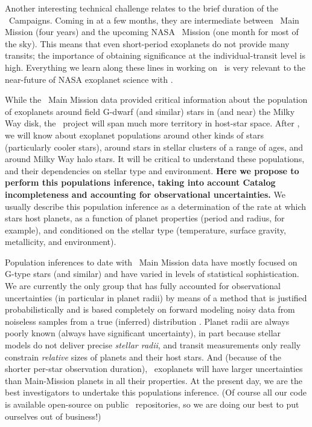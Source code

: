 \documentclass[12pt,preprint]{aastex}
\newcommand{\github}{\project{GitHub}}
\begin{document}
Another interesting technical challenge relates to the brief duration
of the \kt\ Campaigns.
Coming in at a few months, they are intermediate between \kepler\ Main
Mission (four years) and the upcoming NASA \tess\ Mission (one month for most of the sky).
This means that even short-period exoplanets do not provide many
transits; the importance of obtaining significance at the
individual-transit level is high.
Everything we learn along these lines in working on \kt\ is very
relevant to the near-future of NASA exoplanet science with \tess.

While the \kepler\ Main Mission data provided critical information
about the population of exoplanets around field G-dwarf (and similar) stars
in (and near) the Milky Way disk, the \kt\ project will span much more
territory in host-star space.
After \kt, we will know about exoplanet populations around other kinds
of stars (particularly cooler stars), around stars in stellar clusters
of a range of ages, and around Milky Way halo stars.
It will be critical to understand these populations, and their
dependencies on stellar type and environment.
\textbf{Here we propose to perform this populations inference, taking
  into account Catalog incompleteness and accounting for observational
  uncertainties.}
We usually describe this population inference as a determination of the
rate at which stars host planets, as a function of planet properties
(period and radius, for example), and conditioned on the stellar type
(temperature, surface gravity, metallicity, and environment).

Population inferences to date with \kepler\ Main Mission data
\citep{Youdin:2011, Howard:2012, Dong:2013, Petigura:2013,
Foreman-Mackey:2014, Dressing:2015} have
mostly focused on G-type stars (and similar) and have varied in levels of
statistical sophistication.
We are currently the only group that has fully accounted for
observational uncertainties (in particular in planet radii) by means
of a method that is justified probabilistically and is based
completely on forward modeling noisy data from noiseless samples from
a true (inferred) distribution \citep{Foreman-Mackey:2014}.
Planet radii are always poorly known (always have significant
uncertainty), in part because stellar models do not deliver precise
\emph{stellar radii}, and transit measurements only really constrain
\emph{relative} sizes of planets and their host stars.
And (because of the shorter per-star observation duration),
\kt\ exoplanets will have larger uncertainties than Main-Mission
planets in all their properties.
At the present day, we are the best investigators to undertake this
populations inference.
(Of course all our code is available open-source on public
\github\ repositories, so we are doing our best to put
ourselves out of business!)
\end{document}
